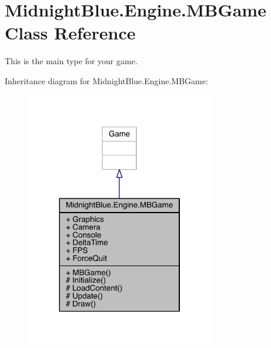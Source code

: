\hypertarget{class_midnight_blue_1_1_engine_1_1_m_b_game}{}\section{Midnight\+Blue.\+Engine.\+M\+B\+Game Class Reference}
\label{class_midnight_blue_1_1_engine_1_1_m_b_game}


This is the main type for your game.  




Inheritance diagram for Midnight\+Blue.\+Engine.\+M\+B\+Game\+:
\nopagebreak
\begin{figure}[H]
\begin{center}
\leavevmode
\includegraphics[width=233pt]{class_midnight_blue_1_1_engine_1_1_m_b_game__inherit__graph}
\end{center}
\end{figure}


